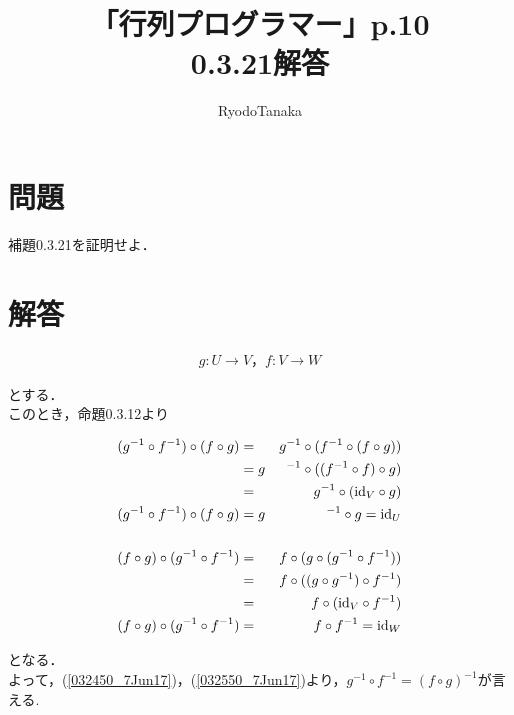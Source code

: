 \documentclass[11pt,a4paper]{jsarticle}
\title{\bf 「行列プログラマー」p.10 \\ 0.3.21解答}
\author{RyodoTanaka}
\date{}
\begin{document}
%
%
\maketitle

\section*{問題}
補題0.3.21を証明せよ．

\section*{解答}

\begin{eqnarray}
g:U→V，f:V→W 
\end{eqnarray}

とする．\\
このとき，命題0.3.12より

\begin{eqnarray}
 (g^{-1}\circ f^{-1})\circ (f\circ g)&=&g^{-1}\circ (f^{-1}\circ (f\circ g)) \nonumber \\
 &=g&^{-1}\circ ((f^{-1}\circ f)\circ g) \nonumber \\
 &=&g^{-1}\circ ({\rm id}_V\circ g) \nonumber \\
 (g^{-1}\circ f^{-1})\circ (f\circ g)&=g&^{-1}\circ g={\rm id}_U\label{032450_7Jun17} \\
 \nonumber \\
 (f\circ g)\circ (g^{-1}\circ f^{-1})&=&f\circ (g\circ (g^{-1}\circ f^{-1})) \nonumber\\
 &=&f\circ ((g\circ g^{-1})\circ f^{-1}) \nonumber \\
 &=&f\circ ({\rm id}_V\circ f^{-1}) \nonumber \\
 (f\circ g)\circ (g^{-1}\circ f^{-1})&=&f\circ f^{-1}={\rm id}_W\label{032550_7Jun17}
\end{eqnarray}

となる．\\
よって，(\ref{032450_7Jun17})，(\ref{032550_7Jun17})より，$g^{-1}\circ f^{-1}=(f\circ g)^{-1}$が言える.
\end{document}
